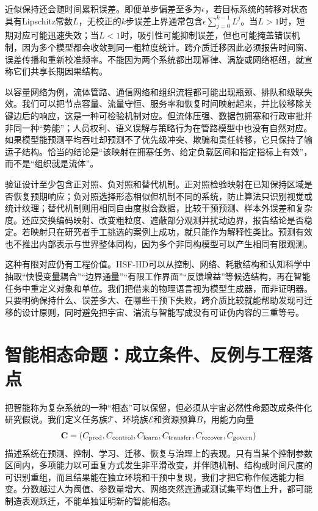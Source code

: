 近似保持还会随时间累积误差。即便单步偏差至多为$\epsilon$，若目标系统的转移对状态具有Lipschitz常数$L$，无校正的$k$步误差上界通常包含$\epsilon\sum_{j=0}^{k-1}L^j$。当$L>1$时，短期对应可能迅速失效；当$L<1$时，吸引性可能抑制误差，但也可能掩盖错误机制，因为多个模型都会收敛到同一粗粒度统计。跨介质迁移因此必须报告时间窗、误差传播和重新校准频率。不能因为两个系统都出现幂律、涡旋或网络枢纽，就宣称它们共享长期因果结构。

以容量网络为例，流体管路、通信网络和组织流程都可能出现瓶颈、排队和级联失效。我们可以把节点容量、流量守恒、服务率和恢复时间映射起来，并比较移除关键边后的响应，这是一种可检验机制对应。但流体压强、数据包拥塞和行政审批并非同一种“势能”；人员权利、语义误解与策略行为在管路模型中也没有自然对应。如果模型能预测平均吞吐却预测不了优先级冲突、欺骗和责任转移，它只保持了输运子结构。恰当的结论是“该映射在拥塞任务、给定负载区间和指定指标上有效”，而不是“组织就是流体”。

验证设计至少包含正对照、负对照和替代机制。正对照检验映射在已知保持区域是否恢复预期响应；负对照选择形态相似但机制不同的系统，防止算法只识别视觉或统计纹理；替代机制则用相同自由度拟合数据，比较干预预测、样本外误差和复杂度。还应交换编码映射、改变粗粒度、遮蔽部分观测并扰动边界，报告结论是否稳定。若映射只在研究者手工挑选的案例上成功，就只能作为解释性类比。预测有效也不推出内部表示与世界整体同构，因为多个非同构模型可以产生相同有限观测。

这种有限对应仍有工程价值。HSF-HD可以从控制、网络、耗散结构和认知科学中抽取“快慢变量耦合”“边界通量”“有限工作界面”“反馈增益”等候选结构，再在智能任务中重定义对象和单位。我们把借来的物理语言视为模型生成器，而非证明器。只要明确保持什么、误差多大、在哪些干预下失败，跨介质比较就能帮助发现可迁移的设计原则，同时避免把宇宙、湍流与智能写成没有可证伪内容的三重等号。

\section{智能相态命题：成立条件、反例与工程落点}
\label{sec:intelligence_as_necessary_phase}

把智能称为复杂系统的一种“相态”可以保留，但必须从宇宙必然性命题改成条件化研究假说。我们定义任务族$\mathcal T$、环境族$\mathcal E$和资源预算$B$，用能力向量
\[
\mathbf C=(C_{\rm pred},C_{\rm control},C_{\rm learn},C_{\rm transfer},C_{\rm recover},C_{\rm govern})
\]
描述系统在预测、控制、学习、迁移、恢复与治理上的表现。只有当某个控制参数区间内，多项能力以可重复方式发生非平滑改变，并伴随机制、结构或时间尺度的可识别重组，而且结果能在独立环境和干预中复现，我们才把它称作候选能力相变。分数越过人为阈值、参数量增大、网络突然连通或测试集平均值上升，都可能制造表观跃迁，不能单独证明新的智能相态。

